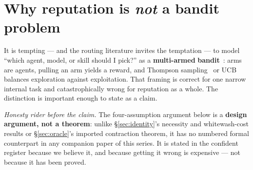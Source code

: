 \documentclass[11pt,a4paper]{article}
\theoremstyle{definition}
\begin{document}

\pdexercisepointer{\ref{ex:stp-bt-vs-elo-regime}}{\ref{ex:stp-rotten-substrate}}{\pageref{ex:stp-bt-vs-elo-regime}}

\section{Why reputation is \emph{not} a bandit problem}\label{sec:not-bandit}

It is tempting --- and the routing literature invites the temptation --- to model
``which agent, model, or skill should I pick?'' as a \textbf{multi-armed}
\textbf{bandit}~: arms are agents, pulling an arm yields a
reward, and Thompson sampling~ or UCB balances exploration
against exploitation. That framing is correct for one narrow internal task and
catastrophically wrong for reputation as a whole. The distinction is important
enough to state as a claim.

\noindent\emph{Honesty rider before the claim.} The four-assumption argument below
is a \textbf{design argument, not a theorem}: unlike \S\ref{sec:identity}'s
necessity and whitewash-cost results or \S\ref{sec:oracle}'s imported contraction
theorem, it has no numbered formal counterpart in any companion paper of this
series. It is stated in the confident register because we believe it, and because
getting it wrong is expensive --- not because it has been proved.

\end{document}
